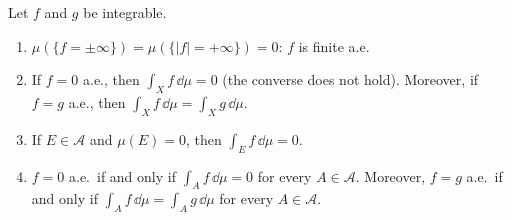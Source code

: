 \begin{proposition}\label{prop:ig-ae}
Let $f$ and $g$ be integrable.
\begin{enumerate}[label=\arabic*)]
  \item $\mu(\{f=\pm\infty\})=\mu(\{|f|=+\infty\})=0$: $f$ is finite a.e.
  \item If $f=0$ a.e., then $\int_Xf\,\dd\mu=0$ (the converse does not hold). Moreover, if $f=g$
    a.e., then $\int_Xf\,\dd\mu=\int_Xg\,\dd\mu$.
  \item If $E\in\mathcal A$ and $\mu(E)=0$, then $\int_Ef\,\dd\mu=0$.
  \item $f=0$ a.e.\ if and only if $\int_Af\,\dd\mu=0$ for every $A\in\mathcal A$. Moreover,
    $f=g$ a.e.\ if and only if $\int_Af\,\dd\mu=\int_Ag\,\dd\mu$ for every $A\in\mathcal A$.
\end{enumerate}
\end{proposition}

